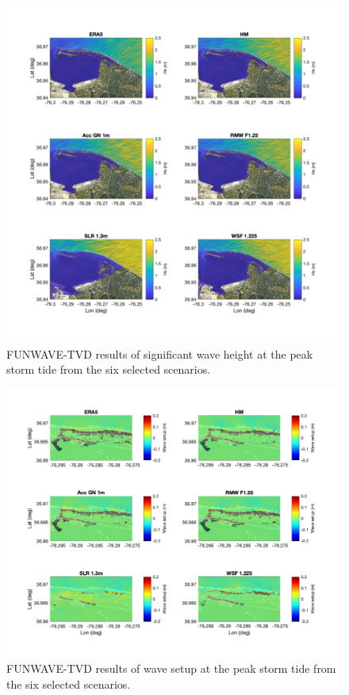 \documentclass[preprint,12pt,authoryear] {elsarticle}
\begin{document}
\begin{figure}
\centering
\includegraphics[width=\textwidth]{./figures/funwave_hs_6_cases.jpg}
\caption{FUNWAVE-TVD results of significant wave height  at the peak storm tide from the six selected scenarios. }
\label{funwave_6_cases_hs}
\centering
\end{figure}

\begin{figure}
\centering
\includegraphics[width=\textwidth]{./figures/funwave_setup_6_cases.jpg}
\caption{FUNWAVE-TVD results of wave setup  at the peak storm tide from the six selected scenarios. }
\label{funwave_6_cases_setup}
\centering
\end{figure}
\end{document}
